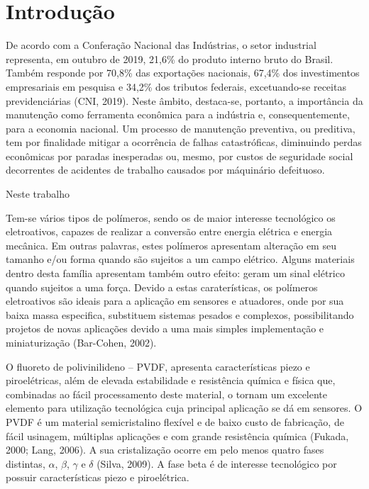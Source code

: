 \documentclass[
	12pt,				
	oneside,			
	a4paper,			
	english,			
	brazil				
	]{abntex2ppgsi}
\begin{document}
\textual




\chapter{Introdução}
De acordo com a Conferação Nacional das Indústrias, o setor industrial representa, em outubro de 2019, 21,6\% do produto interno bruto do Brasil. Também responde por 70,8\% das exportações nacionais, 67,4\% dos investimentos empresariais em pesquisa  e 34,2\% dos tributos federais, excetuando-se receitas previdenciárias (CNI, 2019). Neste âmbito, destaca-se, portanto, a importância da manutenção como ferramenta econômica para a indústria e, consequentemente, para a economia nacional. Um processo de manutenção preventiva, ou preditiva, tem por finalidade mitigar a ocorrência de falhas catastróficas, diminuindo perdas econômicas por paradas inesperadas ou, mesmo, por custos de seguridade social decorrentes de acidentes de trabalho causados por máquinário defeituoso.

Neste trabalho 

Tem-se vários tipos de polímeros, sendo os de maior interesse tecnológico os eletroativos, capazes de realizar a conversão entre energia elétrica e energia mecânica. Em outras palavras, estes polímeros apresentam alteração em seu tamanho e/ou forma quando são sujeitos a um campo elétrico. Alguns  materiais dentro desta família apresentam também outro efeito: geram um sinal elétrico quando sujeitos a uma força. Devido a estas caraterísticas, os polímeros eletroativos são ideais para a aplicação em sensores e atuadores, onde por sua baixa massa especifica, substituem sistemas pesados e complexos, possibilitando projetos de novas aplicações devido a uma mais simples implementação e miniaturização (Bar-Cohen, 2002).

O fluoreto de polivinilideno – PVDF, apresenta características piezo e piroelétricas, além de elevada estabilidade e resistência química e física que, combinadas ao fácil processamento deste material, o tornam um excelente elemento para utilização tecnológica cuja principal aplicação se dá em sensores. O PVDF é um material semicristalino flexível e de baixo custo de fabricação, de fácil usinagem, múltiplas aplicações e com grande resistência química (Fukada, 2000; Lang, 2006). A sua cristalização ocorre em pelo menos quatro fases distintas, $\alpha$, $\beta$, $\gamma$ e $\delta$ (Silva, 2009). A fase beta é de interesse tecnológico por possuir características piezo e piroelétrica.
\end{document}

